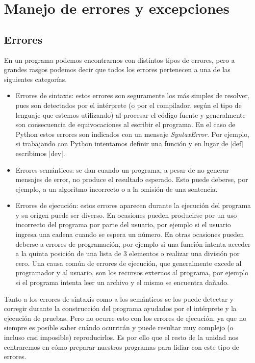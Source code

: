 \chapter{Manejo de errores y excepciones}

\section{Errores}

En un programa podemos encontrarnos con distintos tipos de errores, pero a
grandes rasgos podemos decir que todos los errores pertenecen a una de las
siguientes categorías.

\begin{itemize}

\item Errores de sintaxis: estos errores son seguramente los más simples de
resolver, pues son detectados por el intérprete (o por el compilador, según el
tipo de lenguaje que estemos utilizando) al procesar el código fuente y
generalmente son consecuencia de equivocaciones al escribir el programa. En el
caso de Python estos errores son indicados con un mensaje {\it SyntaxError}.
Por ejemplo, si trabajando con Python intentamos definir una función y en
lugar de |def| escribimos |dev|.

\item Errores semánticos: se dan cuando un programa, a pesar de no generar
mensajes de error, no produce el resultado esperado. Esto puede deberse, por
ejemplo, a un algoritmo incorrecto o a la omisión de una sentencia.

\item Errores de ejecución: estos errores aparecen durante la ejecución del
programa y su origen puede ser diverso. En ocasiones pueden producirse por un
uso incorrecto del programa por parte del usuario, por ejemplo si el usuario
ingresa una cadena cuando se espera un número. En otras ocasiones pueden
deberse a errores de programación, por ejemplo si una función intenta acceder
a la quinta posición de una lista de 3 elementos o realizar una división por
cero. Una causa común de errores de ejecución, que generalmente excede al
programador y al usuario, son los recursos externos al programa, por ejemplo
si el programa intenta leer un archivo y el mismo se encuentra dañado.

\end{itemize}

Tanto a los errores de sintaxis como a los semánticos se los puede detectar y
corregir durante la construcción del programa ayudados por el intérprete y
la ejecución de pruebas. Pero no ocurre esto con los errores de ejecución, ya
que no siempre es posible saber cuándo ocurrirán y puede resultar muy complejo
(o incluso casi imposible) reproducirlos. Es por ello que el resto de la
unidad nos centraremos en cómo preparar nuestros programas para lidiar con
este tipo de errores.

